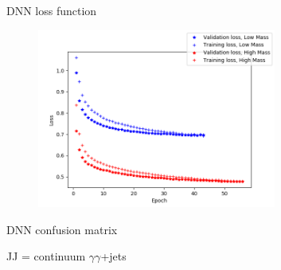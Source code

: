 \begin{frame}{DNN loss function}
\begin{figure}
    \centering
    \includegraphics[width=0.7\textwidth]{BackUp/Part3/Img/Loss_DNN.png}
\end{figure}    
\end{frame}

\begin{frame}{DNN confusion matrix}
\begin{figure}
    \centering
\end{figure}
JJ = continuum $\gamma\gamma$+jets
\end{frame}

